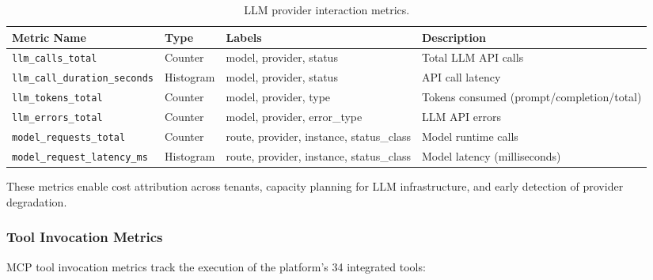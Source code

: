 \begin{table}[ht]
\centering
\caption{LLM provider interaction metrics.}
\label{tab:llm-metrics}
\small
\begin{tabularx}{\textwidth}{lllX}
\hline
\textbf{Metric Name} & \textbf{Type} & \textbf{Labels} & \textbf{Description} \\
\hline
\texttt{llm\_calls\_total} & Counter & model, provider, status & Total LLM API calls \\
\texttt{llm\_call\_duration\_seconds} & Histogram & model, provider, status & API call latency \\
\texttt{llm\_tokens\_total} & Counter & model, provider, type & Tokens consumed (prompt/completion/total) \\
\texttt{llm\_errors\_total} & Counter & model, provider, error\_type & LLM API errors \\
\texttt{model\_requests\_total} & Counter & route, provider, instance, status\_class & Model runtime calls \\
\texttt{model\_request\_latency\_ms} & Histogram & route, provider, instance, status\_class & Model latency (milliseconds) \\
\hline
\end{tabularx}
\end{table}

These metrics enable cost attribution across tenants, capacity planning for LLM infrastructure, and early detection of provider degradation.

\subsubsection{Tool Invocation Metrics}

MCP tool invocation metrics track the execution of the platform's 34 integrated tools:

